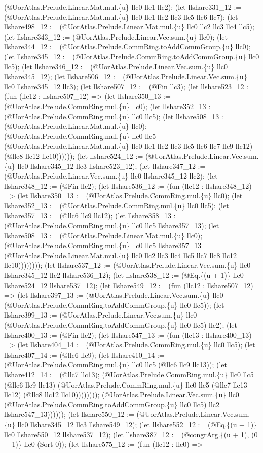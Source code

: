 \documentclass[11pt]{article}
\begin{document}
(@UorAtlas.Prelude.Linear.Mat.mul.\{u\} llc0 llc1 llc2); (let llshare331\_12 := (@UorAtlas.Prelude.Linear.Mat.mul.\{u\} llc0 llc1 llc2 llc3 llc5 llc6 llc7); (let llshare498\_12 := (@UorAtlas.Prelude.Linear.Mat.mul.\{u\} llc0 llc2 llc3 llc4 llc5); (let llshare343\_12 := (@UorAtlas.Prelude.Linear.Vec.sum.\{u\} llc0); (let llshare344\_12 := (@UorAtlas.Prelude.CommRing.toAddCommGroup.\{u\} llc0); (let llshare345\_12 := (@UorAtlas.Prelude.CommRing.toAddCommGroup.\{u\} llc0 llc5); (let llshare346\_12 := (@UorAtlas.Prelude.Linear.Vec.sum.\{u\} llc0 llshare345\_12); (let llshare506\_12 := (@UorAtlas.Prelude.Linear.Vec.sum.\{u\} llc0 llshare345\_12 llc3); (let llshare507\_12 := (@Fin llc3); (let llshare523\_12 := (fun (llc12 : llshare507\_12) => (let llshare350\_13 := (@UorAtlas.Prelude.CommRing.mul.\{u\} llc0); (let llshare352\_13 := (@UorAtlas.Prelude.CommRing.mul.\{u\} llc0 llc5); (let llshare508\_13 := (@UorAtlas.Prelude.Linear.Mat.mul.\{u\} llc0); (@UorAtlas.Prelude.CommRing.mul.\{u\} llc0 llc5 (@UorAtlas.Prelude.Linear.Mat.mul.\{u\} llc0 llc1 llc2 llc3 llc5 llc6 llc7 llc9 llc12) (@llc8 llc12 llc10)))))); (let llshare524\_12 := (@UorAtlas.Prelude.Linear.Vec.sum.\{u\} llc0 llshare345\_12 llc3 llshare523\_12); (let llshare347\_12 := (@UorAtlas.Prelude.Linear.Vec.sum.\{u\} llc0 llshare345\_12 llc2); (let llshare348\_12 := (@Fin llc2); (let llshare536\_12 := (fun (llc12 : llshare348\_12) => (let llshare350\_13 := (@UorAtlas.Prelude.CommRing.mul.\{u\} llc0); (let llshare352\_13 := (@UorAtlas.Prelude.CommRing.mul.\{u\} llc0 llc5); (let llshare357\_13 := (@llc6 llc9 llc12); (let llshare358\_13 := (@UorAtlas.Prelude.CommRing.mul.\{u\} llc0 llc5 llshare357\_13); (let llshare508\_13 := (@UorAtlas.Prelude.Linear.Mat.mul.\{u\} llc0); (@UorAtlas.Prelude.CommRing.mul.\{u\} llc0 llc5 llshare357\_13 (@UorAtlas.Prelude.Linear.Mat.mul.\{u\} llc0 llc2 llc3 llc4 llc5 llc7 llc8 llc12 llc10)))))))); (let llshare537\_12 := (@UorAtlas.Prelude.Linear.Vec.sum.\{u\} llc0 llshare345\_12 llc2 llshare536\_12); (let llshare538\_12 := (@Eq.\{(u + 1)\} llc0 llshare524\_12 llshare537\_12); (let llshare549\_12 := (fun (llc12 : llshare507\_12) => (let llshare397\_13 := (@UorAtlas.Prelude.Linear.Vec.sum.\{u\} llc0 (@UorAtlas.Prelude.CommRing.toAddCommGroup.\{u\} llc0 llc5)); (let llshare399\_13 := (@UorAtlas.Prelude.Linear.Vec.sum.\{u\} llc0 (@UorAtlas.Prelude.CommRing.toAddCommGroup.\{u\} llc0 llc5) llc2); (let llshare400\_13 := (@Fin llc2); (let llshare547\_13 := (fun (llc13 : llshare400\_13) => (let llshare404\_14 := (@UorAtlas.Prelude.CommRing.mul.\{u\} llc0 llc5); (let llshare407\_14 := (@llc6 llc9); (let llshare410\_14 := (@UorAtlas.Prelude.CommRing.mul.\{u\} llc0 llc5 (@llc6 llc9 llc13)); (let llshare412\_14 := (@llc7 llc13); (@UorAtlas.Prelude.CommRing.mul.\{u\} llc0 llc5 (@llc6 llc9 llc13) (@UorAtlas.Prelude.CommRing.mul.\{u\} llc0 llc5 (@llc7 llc13 llc12) (@llc8 llc12 llc10)))))))); (@UorAtlas.Prelude.Linear.Vec.sum.\{u\} llc0 (@UorAtlas.Prelude.CommRing.toAddCommGroup.\{u\} llc0 llc5) llc2 llshare547\_13)))))); (let llshare550\_12 := (@UorAtlas.Prelude.Linear.Vec.sum.\{u\} llc0 llshare345\_12 llc3 llshare549\_12); (let llshare552\_12 := (@Eq.\{(u + 1)\} llc0 llshare550\_12 llshare537\_12); (let llshare387\_12 := (@congrArg.\{(u + 1), (0 + 1)\} llc0 (Sort 0)); (let llshare575\_12 := (fun (llc12 : llc0) => 
\end{document}
